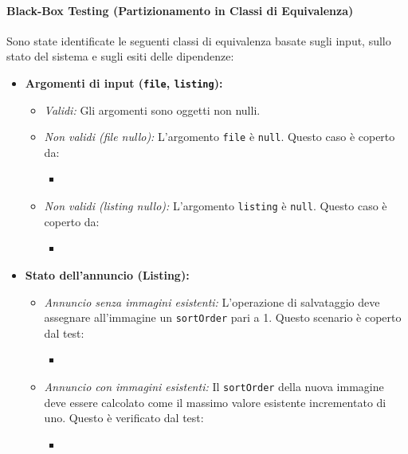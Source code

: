 \paragraph{Black-Box Testing (Partizionamento in Classi di Equivalenza)}
Sono state identificate le seguenti classi di equivalenza basate sugli input, sullo stato del sistema e sugli esiti delle dipendenze:
\begin{itemize}
    \item \textbf{Argomenti di input (\texttt{file}, \texttt{listing}):}
    \begin{itemize}
        \item \textit{Validi:} Gli argomenti sono oggetti non nulli.
        \item \textit{Non validi (file nullo):} L'argomento \texttt{file} è \texttt{null}. Questo caso è coperto da:
        \begin{itemize}
        	\item {}
        \end{itemize}
        \item \textit{Non validi (listing nullo):} L'argomento \texttt{listing} è \texttt{null}. Questo caso è coperto da:
        \begin{itemize}
        	\item {}
        \end{itemize}
    \end{itemize}
    \item \textbf{Stato dell'annuncio (Listing):}
    \begin{itemize}
        \item \textit{Annuncio senza immagini esistenti:} L'operazione di salvataggio deve assegnare all'immagine un \texttt{sortOrder} pari a 1. Questo scenario è coperto dal test:
        \begin{itemize}
        	\item {}
        \end{itemize}
        \item \textit{Annuncio con immagini esistenti:} Il \texttt{sortOrder} della nuova immagine deve essere calcolato come il massimo valore esistente incrementato di uno. Questo è verificato dal test:
        \begin{itemize}
        	\item {}
        \end{itemize}

\end{itemize}
\end{itemize}
